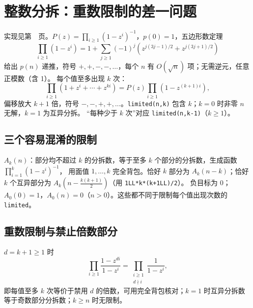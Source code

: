 \section{整数分拆：重数限制的差一问题}\label{knowledge-partitions}
实现见第~\pageref{compact-Partitions}~页。$P(z)=\prod_{i\ge1}(1-z^i)^{-1}$，$p(0)=1$，五边形数定理
\[
\prod_{i\ge1}(1-z^i)=1+\sum_{j\ge1}(-1)^j
\left(z^{j(3j-1)/2}+z^{j(3j+1)/2}\right)
\]
给出 $p(n)$ 递推，符号 $+,+,-,-,\ldots$，每个 $n$ 有 $O(\sqrt n)$ 项；无需逆元，任意正模数（含 1）。
每个值至多出现 $k$ 次：
\[
\prod_{i\ge1}(1+z^i+\cdots+z^{ki})=P(z)\prod_{i\ge1}(1-z^{(k+1)i}),
\]
偏移放大 $k+1$ 倍，符号 $-,-,+,+,\ldots$。\texttt{limited(n,k)} 包含 $k$；$k=0$ 时非零 $n$ 无解，$k=1$ 为互异分拆。
“每种少于 $k$ 次”对应 \texttt{limited(n,k-1)}（$k\ge1$）。

\subsection{三个容易混淆的限制}
$A_k(n)$：部分均不超过 $k$ 的分拆数，等于至多 $k$ 个部分的分拆数，生成函数 $\prod_{i=1}^{k}(1-z^i)^{-1}$，
用面值 $1,\ldots,k$ 完全背包。恰好 $k$ 部分为 $A_k(n-k)$；恰好 $k$ 个互异部分为
$A_k\!\left(n-\frac{k(k+1)}2\right)$（用 \texttt{1LL*k*(k+1LL)/2}）。
负目标为 0；$A_0(0)=1$，$A_0(n)=0$（$n>0$）。这些都不同于限制每个值出现次数的 \texttt{limited}。

\subsection{重数限制与禁止倍数部分}
$d=k+1\ge1$ 时
\[
\prod_{i\ge1}\frac{1-z^{di}}{1-z^i}
=\prod_{\substack{i\ge1\\d\nmid i}}\frac1{1-z^i},
\]
即每值至多 $k$ 次等价于禁用 $d$ 的倍数，可用完全背包核对；$k=1$ 时互异分拆数等于奇数部分分拆数；$k\ge n$ 时无限制。
